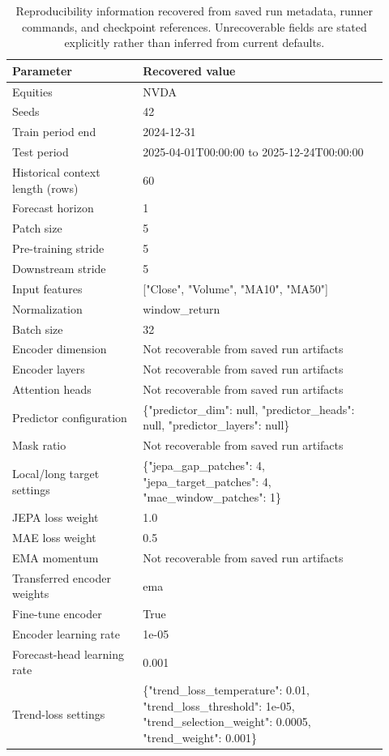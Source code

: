 \begin{table}[p]
\centering
\small
\caption{Reproducibility information recovered from saved run metadata, runner commands, and checkpoint references. Unrecoverable fields are stated explicitly rather than inferred from current defaults.}
\label{tab:reproducibility}
\begin{tabular}{p{0.32\linewidth}p{0.60\linewidth}}
\toprule
Parameter & Recovered value \\
\midrule
Equities & NVDA \\
Seeds & 42 \\
Train period end & 2024-12-31 \\
Test period & 2025-04-01T00:00:00 to 2025-12-24T00:00:00 \\
Historical context length (rows) & 60 \\
Forecast horizon & 1 \\
Patch size & 5 \\
Pre-training stride & 5 \\
Downstream stride & 5 \\
Input features & ["Close", "Volume", "MA10", "MA50"] \\
Normalization & window\_return \\
Batch size & 32 \\
Encoder dimension & Not recoverable from saved run artifacts \\
Encoder layers & Not recoverable from saved run artifacts \\
Attention heads & Not recoverable from saved run artifacts \\
Predictor configuration & \{"predictor\_dim": null, "predictor\_heads": null, "predictor\_layers": null\} \\
Mask ratio & Not recoverable from saved run artifacts \\
Local/long target settings & \{"jepa\_gap\_patches": 4, "jepa\_target\_patches": 4, "mae\_window\_patches": 1\} \\
JEPA loss weight & 1.0 \\
MAE loss weight & 0.5 \\
EMA momentum & Not recoverable from saved run artifacts \\
Transferred encoder weights & ema \\
Fine-tune encoder & True \\
Encoder learning rate & 1e-05 \\
Forecast-head learning rate & 0.001 \\
Trend-loss settings & \{"trend\_loss\_temperature": 0.01, "trend\_loss\_threshold": 1e-05, "trend\_selection\_weight": 0.0005, "trend\_weight": 0.001\} \\

\end{tabular}
\end{table}
